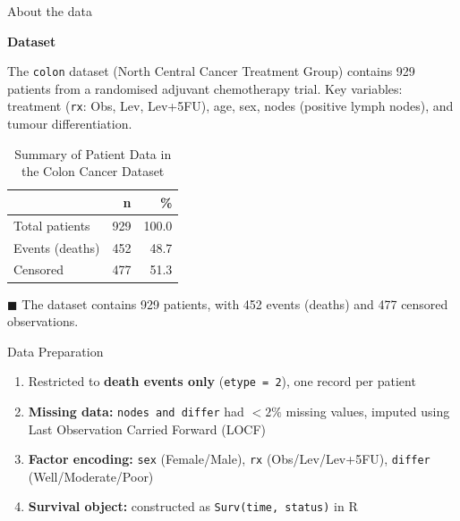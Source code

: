 \documentclass[aspectratio=169, 10pt]{beamer}
\begin{document}
\begin{frame}{About the data}
	
	
	\textbf{Dataset} \medskip
	
	The \texttt{colon} dataset (North Central Cancer Treatment Group) contains
	929 patients from a randomised adjuvant chemotherapy trial.
	Key variables: treatment (\texttt{rx}: Obs, Lev, Lev+5FU), age, sex,
	nodes (positive lymph nodes), and tumour differentiation.
	
	\begin{center}
		
		\begin{table}[ht]  
			\caption{Summary of Patient Data in the Colon Cancer Dataset}  %
			\begin{center}
				\begin{tabular}{lrr}
					\toprule
					& \textbf{n} & \textbf{\%} \\
					\midrule
					Total patients & 929 & 100.0 \\
					Events (deaths) & 452 & 48.7  \\
					Censored        & 477 & 51.3  \\
					\bottomrule
				\end{tabular}
			\end{center}
			\vspace{5pt}  %
			\begin{flushleft}
				\centering
				\small
				$\blacksquare$ The dataset contains 929 patients, with 452 events (deaths) and 477 censored observations.
			\end{flushleft}
		\end{table}
	\end{center}
	
\end{frame}


\begin{frame}{Data Preparation}
	

	\vspace{6pt}
	
	\begin{block}{}
		\begin{enumerate}
			\large
			\item Restricted to \textbf{death events only} (\texttt{etype = 2}),
			one record per patient
			\item \textbf{Missing data:} \texttt{nodes and differ} had $<2\%$ missing values,
			imputed using Last Observation Carried Forward (LOCF)
			\item \textbf{Factor encoding:} \texttt{sex} (Female/Male),
			\texttt{rx} (Obs/Lev/Lev+5FU),
			\texttt{differ} (Well/Moderate/Poor)
			\item \textbf{Survival object:} constructed as
			\texttt{Surv(time, status)} in R
		\end{enumerate}
	\end{block}
	
\end{frame}
\end{document}
